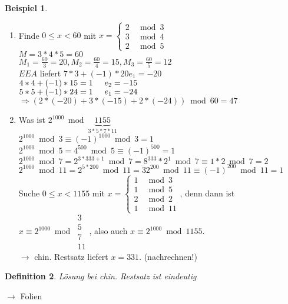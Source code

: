 \documentclass[a4paper,11pt]{article}
\newtheorem{definition}{Definition}[section]
\newtheorem{bsp}[definition]{Beispiel}
\newcommand{\hsp}{\hspace{5mm}}
\begin{document}
\begin{bsp}
\end{bsp}
\begin{enumerate}[label=\alph*)]
	\item Finde $0\leq x<60$ mit $x=\left\{\begin{array}{ll}2 & \bmod3 \\ 3 & \bmod4 \\ 2 & \bmod5\end{array}\right.$ \\
	$M=3*4*5=60$ \\
	$M_1=\frac{60}{3}=20,M_2=\frac{60}{4}=15,M_3=\frac{60}{5}=12$ \\
	$EEA$ liefert $7*3+(-1)*20 e_1=-20$ \\
	$4*4+(-1)*15=1\hsp e_2=-15$ \\
	$5*5+(-1)*24=1\hsp e_1=-24$ \\
	$\Rightarrow(2*(-20)+3*(-15)+2*(-24))\bmod60=47$
	
	\newpage
	
	\item Was ist $2^{1000}\bmod\underbrace{1155}_{3*5*7*11}$ \\
	$2^{1000}\bmod3\equiv(-1)^{1000}\bmod3=1$ \\
	$2^{1000}\bmod5=4^{500}\bmod5\equiv(-1)^{500}=1$ \\
	$2^{1000}\bmod7=2^{3*333+1}\bmod7=8^{333}*2^1\bmod7\equiv1*2\bmod7=2$ \\
	$2^{1000}\bmod11=2^{5*200}\bmod11=32^{200}\bmod11\equiv(-1)^{200}\bmod11=1$ \\
	Suche $0\leq x<1155$ mit $x=\left\{\begin{array}{ll}1 & \bmod3 \\ 1 & \bmod5 \\ 2 & \bmod2 \\ 1 & \bmod11\end{array}\right.$, denn dann ist $x\equiv2^{1000}\bmod\begin{array}{l}3\\5\\7\\11\end{array}$, also auch $x\equiv2^{1000}\bmod1155$. \\
	$\rightarrow$ chin. Restsatz liefert $x=331$. (nachrechnen!)
\end{enumerate}

\begin{definition}
	Lösung bei chin. Restsatz ist eindeutig
\end{definition}
$\rightarrow$ Folien
\end{document}
